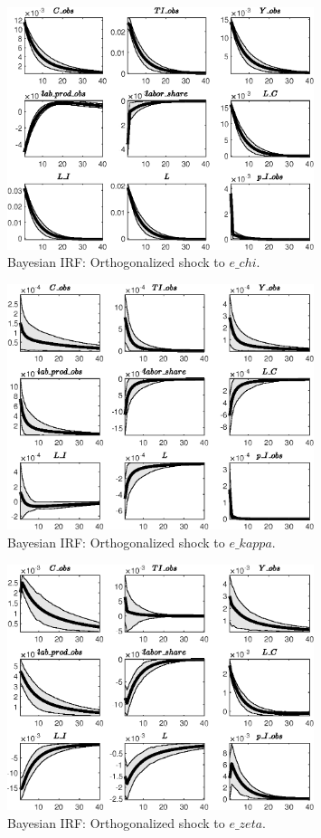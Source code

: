 \begin{figure}[H]
\centering 
\includegraphics[width=0.80\textwidth]{directed_search_est/Output/directed_search_est_Bayesian_IRF_e_chi_1}
\caption{Bayesian IRF: Orthogonalized shock to $e\_chi$.}
\label{Fig:BayesianIRF:e_chi:1}
\end{figure}
 
\begin{figure}[H]
\centering 
\includegraphics[width=0.80\textwidth]{directed_search_est/Output/directed_search_est_Bayesian_IRF_e_kappa_1}
\caption{Bayesian IRF: Orthogonalized shock to $e\_kappa$.}
\label{Fig:BayesianIRF:e_kappa:1}
\end{figure}
 
\begin{figure}[H]
\centering 
\includegraphics[width=0.80\textwidth]{directed_search_est/Output/directed_search_est_Bayesian_IRF_e_zeta_1}
\caption{Bayesian IRF: Orthogonalized shock to $e\_zeta$.}
\label{Fig:BayesianIRF:e_zeta:1}
\end{figure}
 
